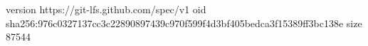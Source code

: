 version https://git-lfs.github.com/spec/v1
oid sha256:976c0327137cc3c22890897439c970f599f4d3bf405bedca3f15389ff3bc138e
size 87544
